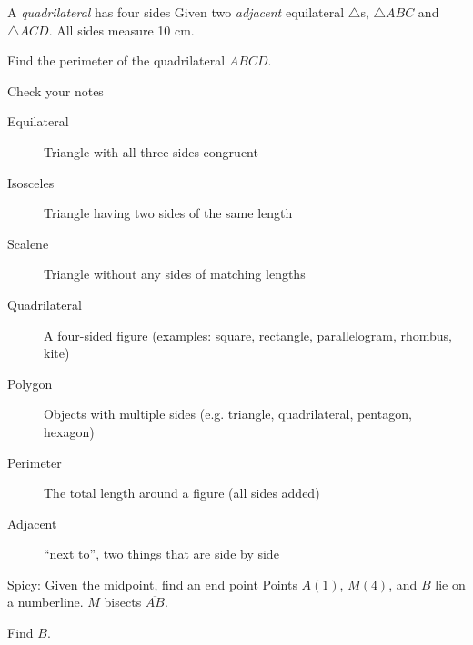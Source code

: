 \begin{frame}{A \emph{quadrilateral} has four sides}
  Given two \emph{adjacent} equilateral $\triangle$s, $\triangle ABC$ and $\triangle ACD$. All sides measure 10 cm. 
  \begin{center}
  \end{center} \bigskip
  Find the perimeter of the quadrilateral $ABCD$. \vspace{3cm}
  \end{frame}

\begin{frame}{Check your notes}
  \begin{description}
    \item[Equilateral] Triangle with all three sides congruent
    \item[Isosceles] Triangle having two sides of the same length
    \item[Scalene] Triangle without any sides of matching lengths
    \item[Quadrilateral] A four-sided figure (examples: square, rectangle, parallelogram, rhombus, kite)
    \item[Polygon] Objects with multiple sides (e.g. triangle, quadrilateral, pentagon, hexagon)
    \item[Perimeter] The total length around a figure (all sides added)
    \item[Adjacent] ``next to'', two things that are side by side
  \end{description}
\end{frame}

\begin{frame}{Spicy: Given the midpoint, find an end point}
  Points $A(1)$, $M(4)$, and $B$ lie on a numberline. $M$ bisects $\overline{AB}$. \par \medskip
  Find $B$.
  \begin{center}
  \end{center}\vspace{2cm}
  \end{frame}

